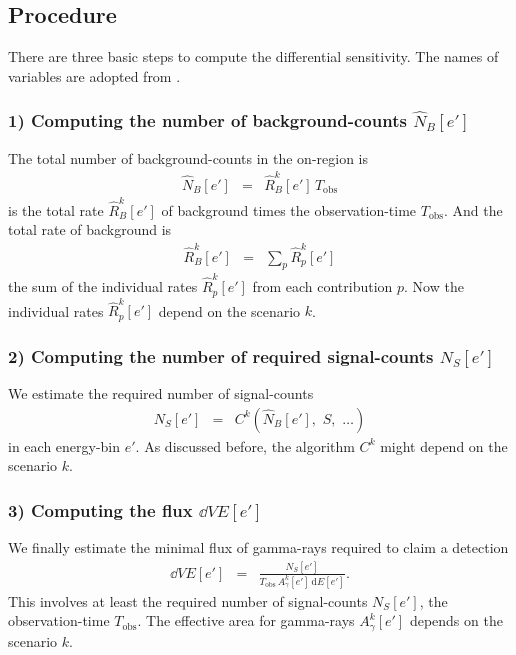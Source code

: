 \documentclass{article}%
\begin{document}
        \subsection{Procedure}
            \label{SubSecProcedure}
            There are three basic steps to compute the differential sensitivity.
            The names of variables are adopted from \cite{li1983analysis}.
            \subsubsection*{1) Computing the number of background-counts $\hat{N}_B[e']$}
                The total number of background-counts in the on-region is
                \begin{eqnarray}
                    \hat{N}_B[e'] &=& \hat{R}^k_B[e'] \, T_\text{obs}
                \end{eqnarray}
                is the total rate $\hat{R}^k_B[e']$ of background times the observation-time $T_\text{obs}$.
                And the total rate of background is
                \begin{eqnarray}
                    \hat{R}^k_B[e'] &=& \sum_{p} \hat{R}^k_p[e']
                \end{eqnarray}
                the sum of the individual rates $\hat{R}^k_p[e']$ from each contribution $p$.
                Now the individual rates $\hat{R}^k_p[e']$ depend on the scenario $k$.
            \subsubsection*{2) Computing the number of required signal-counts $N_S[e']$}
                We estimate the required number of signal-counts
                \begin{eqnarray}
                    N_S[e'] &=& C^k(\hat{N}_B[e'],\,\,S,\,\,\dots)
                \end{eqnarray}
                in each energy-bin $e'$. As discussed before, the algorithm $C^k$ might depend on the scenario $k$.
            \subsubsection*{3) Computing the flux $\dd{V}{E}[e']$}
                We finally estimate the minimal flux of gamma-rays required to claim a detection
                \begin{eqnarray}
                    \dd{V}{E}[e'] &=& \frac{N_S[e']}{{T_\text{obs}}\,{A^k_\gamma}[e']\,\text{d}E[e']}.
                \end{eqnarray}
                This involves at least the required number of signal-counts $N_S[e']$, the observation-time $T_\text{obs}$.
                The effective area for gamma-rays $A^k_\gamma[e']$ depends on the scenario $k$.
\end{document}
